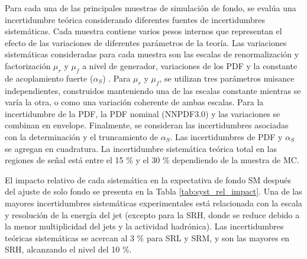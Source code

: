 Para cada una de las principales muestras de simulación de fondo, se evalúa una incertidumbre teórica considerando diferentes fuentes de incertidumbres sistemáticas. Cada muestra
contiene varios pesos internos que representan el efecto de las variaciones de diferentes parámetros de la teoría. Las variaciones sistemáticas consideradas
para cada muestra son las escalas de renormalización y factorización $\mu_{r}$ y $\mu_{f}$ a nivel de generador, variaciones de los PDF \cite{Butterworth:2015oua} y la constante de acoplamiento fuerte ($\alpha_S$) .
Para $\mu_{r}$ y $\mu_{f}$, se utilizan tres parámetros nuisance independientes, construidos manteniendo una de las escalas constante mientras se varía la otra, o como una variación coherente de ambas escalas.
Para la incertidumbre de la PDF, la PDF nominal (NNPDF3.0) y las variaciones se combinan en envelope. Finalmente, se consideran las incertidumbres asociadas con la determinación y el truncamiento de $\alpha_S$. Las incertidumbres de PDF y $\alpha_S$ se agregan en cuadratura. La incertidumbre sistemática teórica total en las regiones de señal está entre el 15 \% y el 30 \% dependiendo de la muestra de MC.

El impacto relativo de cada sistemática en la expectativa de fondo SM después del ajuste de solo fondo se presenta en la Tabla \ref{tab:syst_rel_impact}. Una de las mayores incertidumbres sistemáticas experimentales está relacionada con la escala y resolución de la energía del jet (excepto para la SRH, donde se reduce debido a la menor multiplicidad del jets y la actividad hadrónica). Las incertidumbres teóricas sistemáticas se acercan al 3 \% para SRL y SRM, y son las mayores en SRH, alcanzando el nivel del 10 \%.


